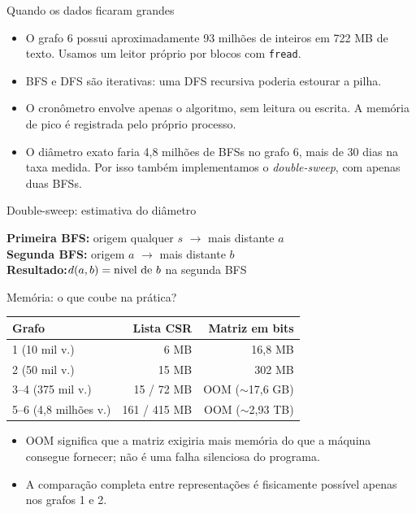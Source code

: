 \documentclass[10pt]{beamer}
\begin{document}
\begin{frame}{Quando os dados ficaram grandes}
\begin{itemize}
\item O grafo 6 possui aproximadamente 93 milh\~oes de inteiros em 722 MB de
texto. Usamos um leitor pr\'oprio por blocos com \texttt{fread}.
\item BFS e DFS s\~ao iterativas: uma DFS recursiva poderia estourar a pilha.
\item O cron\^ometro envolve apenas o algoritmo, sem leitura ou escrita. A
mem\'oria de pico \'e registrada pelo pr\'oprio processo.
\item O di\^ametro exato faria 4,8 milh\~oes de BFSs no grafo 6, mais de 30 dias
na taxa medida. Por isso tamb\'em implementamos o \textit{double-sweep}, com
apenas duas BFSs.
\end{itemize}
\begin{block}{Double-sweep: estimativa do di\^ametro}
\begin{center}\small
\textbf{Primeira BFS:} origem qualquer $s$ $\longrightarrow$
mais distante $a$\\[2pt]
\textbf{Segunda BFS:} origem $a$ $\longrightarrow$
mais distante $b$\\[2pt]
\textbf{Resultado:}\quad $d(a,b)=\textnormal{nivel de }b$
\quad\textnormal{na segunda BFS}
\end{center}
\end{block}
\end{frame}

\begin{frame}{Mem\'oria: o que coube na pr\'atica?}
\begin{center}\small
\begin{tabular}{lrr}
\toprule
Grafo & Lista CSR & Matriz em bits \\
\midrule
1 (10 mil v.) & 6 MB & 16,8 MB \\
2 (50 mil v.) & 15 MB & 302 MB \\
3--4 (375 mil v.) & 15 / 72 MB & OOM ($\sim$17,6 GB) \\
5--6 (4,8 milh\~oes v.) & 161 / 415 MB & OOM ($\sim$2,93 TB) \\
\bottomrule
\end{tabular}
\end{center}
\begin{itemize}
\item OOM significa que a matriz exigiria mais mem\'oria do que a m\'aquina
consegue fornecer; n\~ao \'e uma falha silenciosa do programa.
\item A compara\c c\~ao completa entre representa\c c\~oes \'e fisicamente poss\'ivel
apenas nos grafos 1 e 2.
\end{itemize}
\end{frame}
\end{document}
